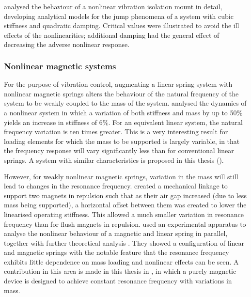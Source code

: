 \documentclass[11pt,a4paper]{memoir}
\begin{document}
\textcite{jazar2006} analysed the behaviour of a nonlinear vibration isolation mount in detail, developing analytical models for the jump phenomena of a system with cubic stiffness and quadratic damping.
Critical values were illustrated to avoid the ill effects of the nonlinearities; additional damping had the general effect of decreasing the adverse nonlinear response.

\subsubsection{Nonlinear magnetic systems}

For the purpose of vibration control, augmenting a linear spring system with nonlinear magnetic springs alters the behaviour of the natural frequency of the system to be weakly coupled to the mass of the system.
\textcite{dangola2006} analysed the dynamics of a nonlinear system in which a variation of both stiffness and mass by up to 50\% yields an increase in stiffness of 6\%.
For an equivalent linear system, the natural frequency variation is ten times greater.
This is a very interesting result for loading elements for which the mass to be supported is largely variable, in that the frequency response will vary significantly less than for conventional linear springs.
A system with similar characteristics is proposed in this thesis ().

However, for weakly nonlinear magnetic springs, variation in the mass will still lead to changes in the resonance frequency.
\textcite{todaka2001-ietm} created a mechanical linkage to support two magnets in repulsion such that as their air gap increased (due to less mass being supported), a horizontal offset between them was created to lower the linearised operating stiffness.
This allowed a much smaller variation in resonance frequency than for flush magnets in repulsion.
\textcite{bonisoli2007-mssp} used an experimental apparatus to analyse the nonlinear behaviour of a magnetic and linear spring in parallel, together with further theoretical analysis \cite{bonisoli2007-mrc}.
They showed a configuration of linear and magnetic springs with the notable feature that the resonance frequency exhibits little dependence on mass loading and nonlinear effects can be seen.
A contribution in this area is made in this thesis in , in which a purely magnetic device is designed to achieve constant resonance frequency with variations in mass.
\end{document}
